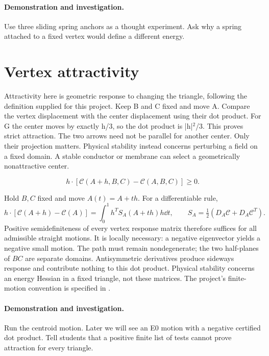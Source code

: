\documentclass[11pt,oneside,openany]{book}
\newcommand{\TC}{\mathcal C}\newcommand{\mean}{\operatorname{mean}}
\begin{document}
\paragraph{Demonstration and investigation.} Use three sliding spring anchors as a thought experiment. Ask why a spring attached to a fixed vertex would define a different energy.


\section{Vertex attractivity}\label{sec:slide7}

Attractivity here is geometric response to changing the triangle, following the definition supplied for this project. Keep B and C fixed and move A. Compare the vertex displacement with the center displacement using their dot product. For G the center moves by exactly h/3, so the dot product is |h|\ensuremath{^2}/3. This proves strict attraction. The two arrows need not be parallel for another center. Only their projection matters. Physical stability instead concerns perturbing a field on a fixed domain. A stable conductor or membrane can select a geometrically nonattractive center.


\[h\cdot[\TC(A+h,B,C)-\TC(A,B,C)]\ge0.\]



Hold $B,C$ fixed and move $A(t)=A+th$. For a differentiable rule,
\[
h\cdot[\TC(A+h)-\TC(A)]
=\int_0^1 h^T S_A(A+th)h\dd t,\qquad
S_A=\tfrac12(D_A\TC+D_A\TC^T).
\]
Positive semidefiniteness of every vertex response matrix therefore
suffices for all admissible straight motions. It is locally necessary:
a negative eigenvector yields a negative small motion.
The path must remain nondegenerate; the two half-planes of $BC$ are
separate domains. Antisymmetric derivatives produce sideways response
and contribute nothing to this dot product.
Physical stability concerns an energy Hessian in a fixed triangle,
not these matrices. The project's finite-motion convention is
specified in \cite{attractive}.




\paragraph{Demonstration and investigation.} Run the centroid motion. Later we will see an E0 motion with a negative certified dot product. Tell students that a positive finite list of tests cannot prove attraction for every triangle.
\end{document}
